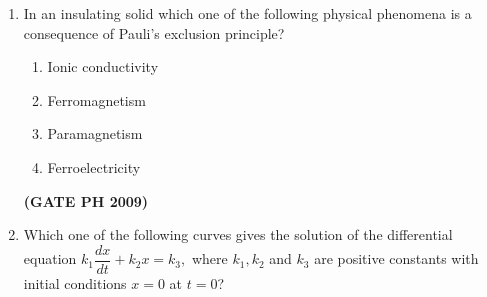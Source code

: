 \documentclass[14pt, a4paper]{extarticle}
\begin{document}
\begin{enumerate}[label=\textbf{Q. \arabic*}]
\item In an insulating solid which one of the following physical phenomena is a consequence of Pauli's exclusion principle?
    \begin{enumerate}
        \item Ionic conductivity
        \item Ferromagnetism
        \item Paramagnetism
        \item Ferroelectricity
    \end{enumerate}
    \hfill \textbf{(GATE PH 2009)}

\item Which one of the following curves gives the solution of the differential equation
$ k_1\dfrac{dx}{dt} + k_2x = k_3, $
where $k_1, k_2$ and $k_3$ are positive constants with initial conditions $x=0$ at $t=0$?
\begin{enumerate}
\end{enumerate}
\end{enumerate}
\end{document}
